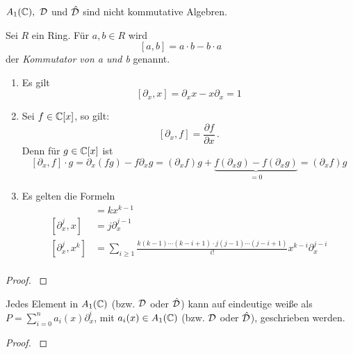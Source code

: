 \begin{rem}
$A_1(\mathbb{C}),~\mathcal{D}$ und $\hat{\mathcal{D}}$ sind nicht kommutative Algebren.
\end{rem}

\begin{defn}[Kommutator]%
Sei $R$ ein Ring. Für $a,b\in R$ wird
\[[a,b]=a\cdot b-b\cdot a\]
der \emph{Kommutator von a und b} genannt.
\end{defn}

\begin{prop} %
\begin{enumerate}
\item Es gilt
\[[ \partial_x,x] = \partial_xx-x\partial_x=1 \]
\item Sei $f\in \mathbb{C}[x]$, so gilt:
\[ [\partial_x,f] = \frac{\partial f}{\partial x} \,. \]
Denn für $g\in \mathbb{C}[x]$ ist
\[
[\partial_x,f]\cdot g=\partial_x(fg)-f\partial_xg=
  (\partial_xf)g+\underset{=0}{\underbrace{ 
  f(\partial_xg)-f(\partial_xg)}}=
  (\partial_xf)g
\]
\item Es gelten die Formeln\\
\begin{align*}
[\partial_x,x^k]   &= kx^{k-1}\\
[\partial_x^j,x]   &= j\partial_x^{j-1}\\
[\partial_x^j,x^k] &= \sum_{i\geq1}\frac{k(k-1)\cdots(k-i+1)
  \cdot j(j-1)\cdots(j-i+1)}{i!}x^{k-i}\partial_x^{j-i} \\
\end{align*}
\end{enumerate}
\end{prop}
\begin{proof}
\cite{ZulaBarbara}
\end{proof}

\begin{prop} \label{prop:weyl_eindeutige_schreibung}
Jedes Element in $A_1(\mathbb{C})$ (bzw. $\mathcal{D}$ oder $\hat{\mathcal{D}}$) kann auf eindeutige
weiße als $P=\sum_{i=0}^na_i(x)\partial_x^i$, mit $a_i(x)\in A_1(\mathbb{C})$ (bzw.
$\mathcal{D}$ oder $\hat{\mathcal{D}}$), geschrieben werden. 
\end{prop}
\begin{proof}
\cite[Proposition 1.2.3]{sabbah_cimpa90}
\begin{comment}
ein teil des Beweises ist "left as an exersice"
\end{comment}
\end{proof}

